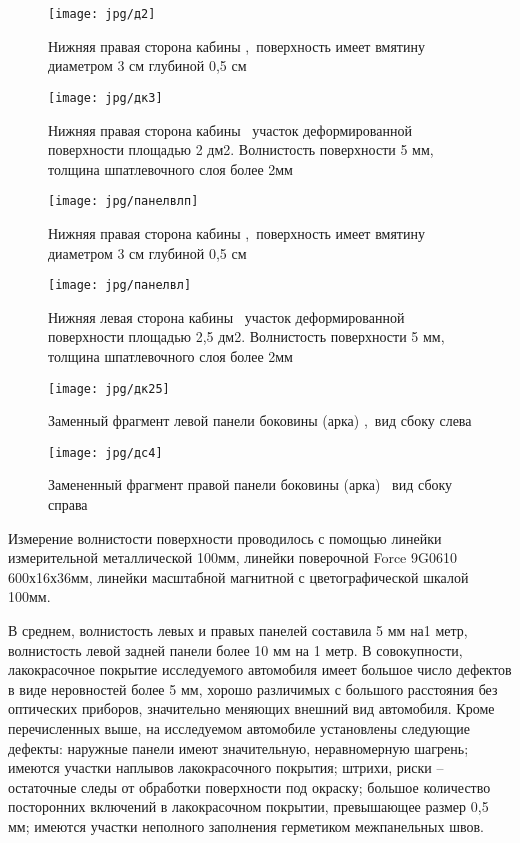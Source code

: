 {   \begin{figure}[H]\centering
	\parbox[t]{0.49\textwidth}
	{\centering
		\texttt{[image: jpg/д2]}
		\caption{\footnotesize {Нижняя правая сторона кабины ,\, поверхность имеет вмятину диаметром 3 см глубиной 0,5 см}}
		\label{кабинаснизусправа}}
	\hfil \hfil
	\parbox[t]{0.49\textwidth}
	{\centering
		\texttt{[image: jpg/дк3]}
		\caption{\footnotesize {Нижняя правая сторона кабины \tc\, участок деформированной поверхности площадью 2 дм2. Волнистость поверхности 5 мм, толщина шпатлевочного слоя более 2мм}}
		\label{кабинаволнистость}}
\end{figure}


\begin{figure}[H]\centering
	\parbox[t]{0.49\textwidth}
	{\centering
		\texttt{[image: jpg/панелвлп]}
		\caption{\footnotesize {Нижняя правая сторона кабины ,\, поверхность имеет вмятину диаметром 3 см глубиной 0,5 см}}
		\label{панелвлп}}
	\hfil \hfil
	\parbox[t]{0.49\textwidth}
	{\centering
		\texttt{[image: jpg/панелвл]}
		\caption{\footnotesize {Нижняя левая сторона кабины \tc\, участок деформированной поверхности площадью 2,5 дм2. Волнистость поверхности 5 мм, толщина шпатлевочного слоя более 2мм}}
		\label{панельвл}}
\end{figure}



   \begin{figure}[H]\centering
	\parbox[t]{0.49\textwidth}
	{\centering
		\texttt{[image: jpg/дк25]}
		\caption{\footnotesize {Заменный фрагмент левой панели боковины (арка) ,\, вид сбоку слева}}
		\label{аркасправа}}
	\hfil \hfil
	\parbox[t]{0.49\textwidth}
	{\centering
		\texttt{[image: jpg/дс4]}
		\caption{\footnotesize {Замененный фрагмент правой панели боковины (арка) \tc\, вид сбоку справа}}
		\label{аркаслева}}
\end{figure}
   
%   
   
    Измерение волнистости поверхности проводилось с помощью линейки измерительной    металлической 100мм, линейки поверочной Force 9G0610 600х16х36мм, линейки    масштабной магнитной с цветографической шкалой 100мм.
   
   
   В среднем, волнистость левых и правых панелей составила 5 мм на1 метр, волнистость
   левой задней панели более 10 мм на 1 метр.
   В совокупности, лакокрасочное покрытие исследуемого автомобиля имеет большое
   число дефектов в виде неровностей более 5 мм, хорошо различимых с большого расстояния без оптических
   приборов, значительно меняющих внешний вид автомобиля.
   Кроме  перечисленных выше, на исследуемом автомобиле установлены
   следующие дефекты: наружные панели имеют значительную, неравномерную шагрень;
   имеются участки наплывов лакокрасочного покрытия; штрихи, риски – остаточные следы от
   обработки поверхности под окраску; большое количество посторонних включений в
   лакокрасочном покрытии, превышающее размер 0,5 мм; имеются участки неполного
   заполнения герметиком межпанельных швов. 
   
}
